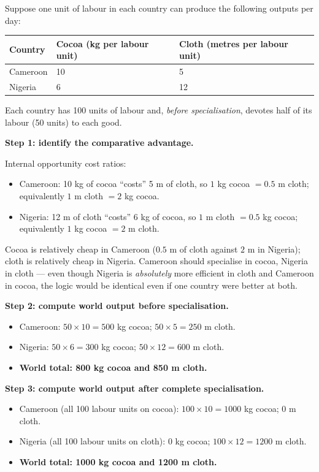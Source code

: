 \documentclass[11pt]{article}
\newcommand{\cle}[1]{{\popxbold\color{popdark}#1}}
\begin{document}
\begin{exemplebox}
Suppose one unit of labour in each country can produce the following outputs per day:

\begin{center}
\begin{tabularx}{\linewidth}{|l|X|X|}
\hline
\rowcolor{popblueL} \textbf{Country} & \textbf{Cocoa (kg per labour unit)} & \textbf{Cloth (metres per labour unit)} \\
\hline
Cameroon & 10 & 5 \\
\hline
Nigeria & 6 & 12 \\
\hline
\end{tabularx}
\end{center}

Each country has 100 units of labour and, \emph{before specialisation}, devotes half of its labour (50 units) to each good.
\end{exemplebox}

\textbf{Step 1: identify the comparative advantage.}\par
Internal opportunity cost ratios:
\begin{itemize}
\item Cameroon: 10 kg of cocoa ``costs'' 5 m of cloth, so $1$ kg cocoa $= 0.5$ m cloth; equivalently $1$ m cloth $= 2$ kg cocoa.
\item Nigeria: 12 m of cloth ``costs'' 6 kg of cocoa, so $1$ m cloth $= 0.5$ kg cocoa; equivalently $1$ kg cocoa $= 2$ m cloth.
\end{itemize}
Cocoa is relatively cheap in Cameroon ($0.5$ m of cloth against $2$ m in Nigeria); cloth is relatively cheap in Nigeria. Cameroon should specialise in \cle{cocoa}, Nigeria in \cle{cloth} --- even though Nigeria is \emph{absolutely} more efficient in cloth and Cameroon in cocoa, the logic would be identical even if one country were better at both.

\textbf{Step 2: compute world output before specialisation.}\par
\begin{itemize}
\item Cameroon: $50 \times 10 = 500$ kg cocoa; $50 \times 5 = 250$ m cloth.
\item Nigeria: $50 \times 6 = 300$ kg cocoa; $50 \times 12 = 600$ m cloth.
\item \textbf{World total: 800 kg cocoa and 850 m cloth.}
\end{itemize}

\textbf{Step 3: compute world output after complete specialisation.}\par
\begin{itemize}
\item Cameroon (all 100 labour units on cocoa): $100 \times 10 = 1000$ kg cocoa; $0$ m cloth.
\item Nigeria (all 100 labour units on cloth): $0$ kg cocoa; $100 \times 12 = 1200$ m cloth.
\item \textbf{World total: 1000 kg cocoa and 1200 m cloth.}
\end{itemize}
\end{document}
